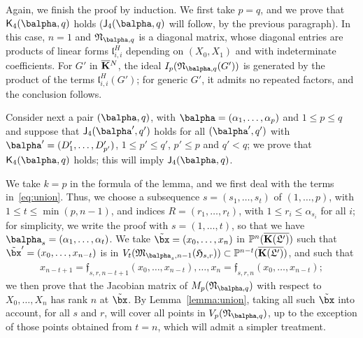 \documentclass[12pt]{article}
\begin{document}
Again, we finish the proof by induction. We first take $p=q$, and we
prove that $\assJ_4(\balpha,q)$ holds ($\assI_4(\balpha,q)$ will follow,
by the previous paragraph). In this case, $n=1$ and
$\mathfrak{N}_{\balpha,q}$ is a diagonal matrix, whose diagonal entries
are products of linear forms $\mathfrak{l}^H_{i,i}$ depending on
$(X_0,X_1)$ and with indeterminate coefficients. For $G'$ in
$\overline{\mathbf{K}}{}^N$, the ideal $I_p(\mathfrak{N}_{\balpha,q}(G'))$ is generated by
the product of the terms $\mathfrak{l}^H_{i,i}(G')$; for generic $G'$, it
admits no repeated factors, and the conclusion follows.

Consider next a pair $(\balpha,q)$, with $\balpha=(\alpha_1,\dots,\alpha_p)$ and $1 \le p
\le q$ and suppose that $\assI_4(\balpha',q')$ holds for all $(\balpha',q')$
with $\balpha'=(D'_1,\dots,D'_{p'})$, $1 \le p' \le q'$, $p' \le p$ and $q' <
q$; we prove that $\assJ_4(\balpha,q)$ holds; this will imply
 $\assI_4(\balpha,q)$. 

We take $k=p$ in the formula of the lemma, and we first deal with the
terms in~\eqref{eq:union}.  Thus, we choose a subsequence
$s=(s_1,\dots,s_t)$ of $(1,\dots,p)$, with $1 \le t\le \min(p,n-1)$,
and indices $R=(r_1,\dots,r_t)$, with $ 1\le r_i \le \alpha_{s_i}$ for all
$i$; for simplicity, we write the proof with $s=(1,\dots,t)$, so that
we have $\balpha_s=(\alpha_1,\dots,\alpha_t)$. We take $\tilde\bx=(x_0,\dots,x_n)$
in $\mathbb{P}^n(\overline{\mathbf{K}(\mathfrak{L}')})$ such that $\tilde \bx'=(x_0,\dots,x_{n-t})$
is in $V_t(\mathfrak{M}_{\balpha_s,n-1}(\mathfrak{H}_{s,r})) \subset
\P^{n-t}(\KKGpbar)$, and such that 
\begin{align}\label{eq:subsX}
  x_{n-t+1}=\mathfrak{f}_{s,r,n-t+1}(x_0,\dots,x_{n-t}),\dots,x_{n}=\mathfrak{f}_{s,r,n}(x_0,\dots,x_{n-t});
\end{align}
we then prove that the Jacobian matrix of $M_p(\mathfrak{N}_{\balpha,q})$
with respect to $X_0,\dots,X_n$ has rank $n$ at $\tilde\bx$.  By
Lemma~\ref{lemma:union}, taking all such $\tilde\bx$ into account, for
all $s$ and $r$, will cover all points in $V_p(\mathfrak{N}_{\balpha,q})$, up to the
exception of those points obtained from $t=n$, which will admit a
simpler treatment.
\end{document}
